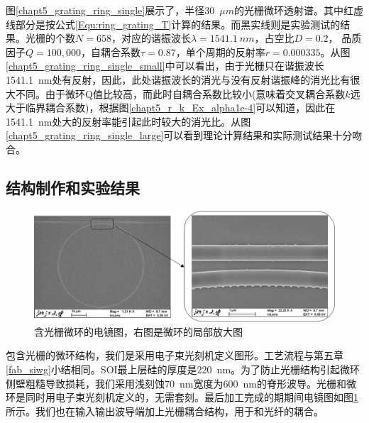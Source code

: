 图\ref{chapt5_grating_ring_single}展示了，半径30~$\mu m$的光栅微环透射谱。其中红虚线部分是按公式\ref{Equ:ring_grating_T}计算的结果。而黑实线则是实验测试的结果。光栅的个数$N = 658$，对应的谐振波长$\lambda = 1541.1~nm$，占空比$D = 0.2$， 品质因子$Q = 100,000$，自耦合系数$\tau = 0.87$，单个周期的反射率$r = 0.000335$。从图\ref{chapt5_grating_ring_single_small}中可以看出，由于光栅只在谐振波长1541.1~nm处有反射，因此，此处谐振波长的消光与没有反射谐振峰的消光比有很大不同。由于微环Q值比较高，而此时自耦合系数比较小(意味着交叉耦合系数$k$远大于临界耦合系数)，根据图\ref{chapt5_r_k_Ex_alpha1e-4}可以知道，因此在1541.1~nm处大的反射率能引起此时较大的消光比。从图\ref{chapt5_grating_ring_single_large}可以看到理论计算结果和实际测试结果十分吻合。

\subsection{结构制作和实验结果}
\begin{figure}[htb]
	\centering
	\includegraphics[width=12cm]{./Pictures/chapt5_ring_grating_reflector_structure_real.jpg}
	\caption{含光栅微环的电镜图，右图是微环的局部放大图}
	\label{chapt5_ring_grating_reflector_structure_real}
\end{figure}
包含光栅的微环结构，我们是采用电子束光刻机定义图形。工艺流程与第五章\ref{fab_siwg}小结相同。SOI最上层硅的厚度是220~nm。为了防止光栅结构引起微环侧壁粗糙导致损耗，我们采用浅刻蚀70~nm宽度为600~nm的脊形波导。光栅和微环是同时用电子束光刻机定义的，无需套刻。最后加工完成的期期间电镜图如图\ref{chapt5_ring_grating_reflector_structure_real}所示。我们也在输入输出波导端加上光栅耦合结构，用于和光纤的耦合。

